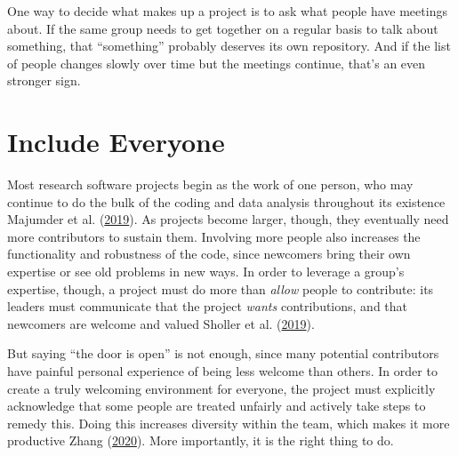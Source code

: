 \documentclass[
]{krantz}
\begin{document}
One way to decide what makes up a project is to ask what people have meetings about.
If the same group needs to get together on a regular basis to talk about something,
that ``something'' probably deserves its own repository.
And if the list of people changes slowly over time but the meetings continue,
that's an even stronger sign.

\hypertarget{teams-inclusive}{%
\section{Include Everyone}\label{teams-inclusive}}

Most research software projects begin as the work of one person,
who may continue to do the bulk of the coding and data analysis throughout its existence Majumder et al. (\protect\hyperlink{ref-Maju2019}{2019}).
As projects become larger,
though,
they eventually need more contributors to sustain them.
Involving more people also increases the functionality and robustness of the code,
since newcomers bring their own expertise or see old problems in new ways.
In order to leverage a group's expertise,
though,
a project must do more than \emph{allow} people to contribute:
its leaders must communicate that the project \emph{wants} contributions,
and that newcomers are welcome and valued Sholler et al. (\protect\hyperlink{ref-Shol2019}{2019}).

But saying ``the door is open'' is not enough,
since many potential contributors have painful personal experience of being less welcome than others.
In order to create a truly welcoming environment for everyone,
the project must explicitly acknowledge that some people are treated unfairly
and actively take steps to remedy this.
Doing this increases diversity within the team,
which makes it more productive Zhang (\protect\hyperlink{ref-Zhan2020}{2020}).
More importantly,
it is the right thing to do.
\end{document}
